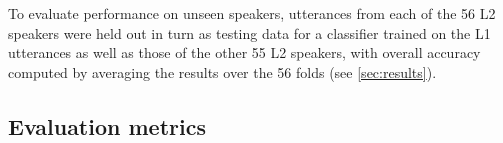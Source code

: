 \documentclass[a4paper]{article}
\begin{document}
		{\color{blue}
		To evaluate performance on unseen speakers, utterances from each of the 56 L2 speakers were held out in turn as testing data for a classifier trained on the L1 utterances as well as those of the other 55 L2 speakers, with overall accuracy computed by averaging the results over the 56 folds (see \cref{sec:results}).
		}
		
		\subsection{Evaluation metrics}
		\label{sec:method:eval}
		
\end{document}
